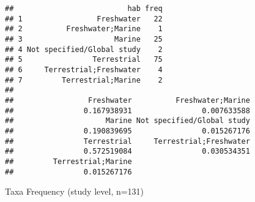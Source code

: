 \documentclass[
]{article}
\newenvironment{Shaded}{\begin{snugshade}}{\end{snugshade}}
\newcommand{\KeywordTok}[1]{\textcolor[rgb]{0.13,0.29,0.53}{\textbf{#1}}}
\newcommand{\NormalTok}[1]{#1}
\newcommand{\OperatorTok}[1]{\textcolor[rgb]{0.81,0.36,0.00}{\textbf{#1}}}
\newcommand{\StringTok}[1]{\textcolor[rgb]{0.31,0.60,0.02}{#1}}
\begin{document}
\begin{Shaded}
\end{Shaded}

\begin{verbatim}
##                          hab freq
## 1                 Freshwater   22
## 2          Freshwater;Marine    1
## 3                     Marine   25
## 4 Not specified/Global study    2
## 5                Terrestrial   75
## 6     Terrestrial;Freshwater    4
## 7         Terrestrial;Marine    2
## 
##                 Freshwater          Freshwater;Marine 
##                0.167938931                0.007633588 
##                     Marine Not specified/Global study 
##                0.190839695                0.015267176 
##                Terrestrial     Terrestrial;Freshwater 
##                0.572519084                0.030534351 
##         Terrestrial;Marine 
##                0.015267176
\end{verbatim}

Taxa Frequency (study level, n=131)
\end{document}
